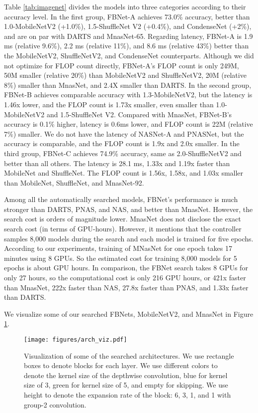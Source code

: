 \documentclass[10pt,twocolumn,letterpaper]{article}
\begin{document}
Table \ref{tab:imagenet} divides the models into three categories according to their accuracy level. In the first group, FBNet-A achieves 73.0\% accuracy, better than 1.0-MobileNetV2 (+1.0\%), 1.5-ShuffleNet V2 (+0.4\%), and CondenseNet (+2\%), and are on par with DARTS and MnasNet-65. Regarding latency, FBNet-A is 1.9 ms (relative 9.6\%), 2.2 ms (relative 11\%), and 8.6 ms (relative 43\%) better than the MobileNetV2, ShuffleNetV2, and CondenseNet counterparts. Although we did not optimize for FLOP count directly, FBNet-A's FLOP count is only 249M, 50M smaller (relative 20\%) than MobileNetV2 and ShuffleNetV2, 20M (relative 8\%) smaller than MnasNet, and 2.4X smaller than DARTS. In the second group, FBNet-B achieves comparable accuracy with 1.3-MobileNetV2, but the latency is 1.46x lower, and the FLOP count is 1.73x smaller, even smaller than 1.0-MobileNetV2 and 1.5-ShuffleNet V2. Compared with MnasNet, FBNet-B's accuracy is 0.1\% higher, latency is 0.6ms lower, and FLOP count is 22M (relative 7\%) smaller. We do not have the latency of NASNet-A and PNASNet, but the accuracy is comparable, and the FLOP count is 1.9x and 2.0x smaller. In the third group, FBNet-C achieves 74.9\% accuracy, same as 2.0-ShuffleNetV2 and better than all others. The latency is 28.1 ms, 1.33x and 1.19x faster than MobileNet and ShuffleNet. The FLOP count is 1.56x, 1.58x, and 1.03x smaller than MobileNet, ShuffleNet, and MnasNet-92.

Among all the automatically searched models, FBNet's performance is much stronger than DARTS, PNAS, and NAS, and better than MnasNet. However, the search cost is orders of magnitude lower. MnasNet \cite{tan2018mnasnet} does not disclose the exact search cost (in terms of GPU-hours). However, it mentions that the controller samples 8,000 models during the search and each model is trained for five epochs. According to our experiments, training of MNasNet for one epoch takes 17 minutes using 8 GPUs. So the estimated cost for training 8,000 models for 5 epochs is about  GPU hours. In comparison, the FBNet search takes 8 GPUs for only 27 hours, so the computational cost is only 216 GPU hours, or 421x faster than MnasNet, 222x faster than NAS, 27.8x faster than PNAS, and 1.33x faster than DARTS.

We visualize some of our searched FBNets, MobileNetV2, and MnasNet in Figure \ref{fig:arch_viz}. 


\begin{figure}[h]
\begin{center}
\texttt{[image: figures/arch\_viz.pdf]}
\end{center}
\caption{Visualization of some of the searched architectures. We use rectangle boxes to denote blocks for each layer. We use different colors to denote the kernel size of the depthwise convolution, blue for kernel size of 3, green for kernel size of 5, and empty for skipping. We use height to denote the expansion rate of the block: 6, 3, 1, and 1 with group-2 convolution.}
\label{fig:arch_viz}
\vspace{-10pt}
\end{figure}
\end{document}
